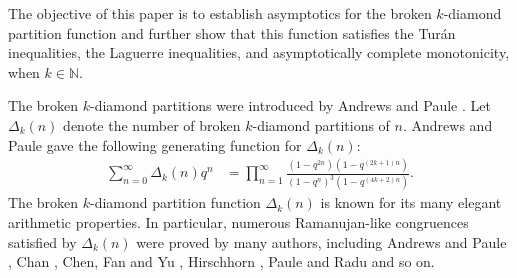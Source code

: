 \documentclass[12pt]{article}
\numberwithin{equation}{section}
\begin{document}
The objective of this paper is to establish asymptotics for the broken $k$-diamond partition function and further show that this function satisfies the Tur\'an inequalities, the Laguerre inequalities, and asymptotically complete monotonicity, when $k\in\mathbb{N}$.

The broken $k$-diamond partitions were introduced by Andrews and Paule \cite{Andrews-Paule-2007}.
Let $\Delta_{k}(n)$ denote the number of broken $k$-diamond partitions of $n$. Andrews and Paule \cite{Andrews-Paule-2007} gave the following generating function for $\Delta_{k}(n)$:
\begin{align}\label{genef}
\sum_{n=0}^{\infty} \Delta_{k}(n) q^{n} &=\prod_{n=1}^{\infty} \frac{\left(1-q^{2 n}\right)\left(1-q^{(2 k+1) n}\right)}{\left(1-q^{n}\right)^{3}\left(1-q^{(4 k+2) n}\right)}.
\end{align}
The broken $k$-diamond partition function $\Delta_{k}(n)$ is known for its many elegant arithmetic properties. In particular, numerous Ramanujan-like congruences satisfied by $\Delta_k(n)$ were proved by many authors, including Andrews and Paule \cite{Andrews-Paule-2007}, Chan \cite{Chan-2008}, Chen, Fan and Yu \cite{Chen-Fan-Yu-2014}, Hirschhorn \cite{Hirschhorn-2018}, Paule and Radu \cite{Paule-Radu-2010} and so on.
\end{document}
